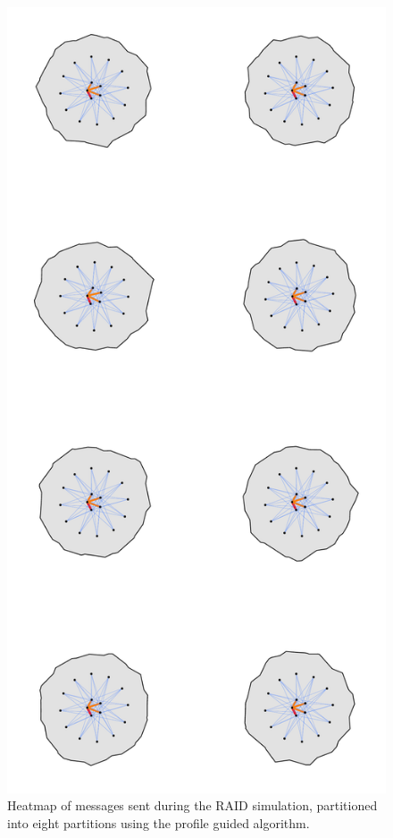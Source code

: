 \documentclass[11pt]{book}
\begin{document}
\begin{figure}
\centering
\includegraphics[width=\textwidth,height=0.9\textheight,keepaspectratio]{figs/RAID_8part}
\caption{Heatmap of messages sent during the RAID simulation, partitioned into eight partitions using the profile guided algorithm.}
\end{figure}
\end{document}

